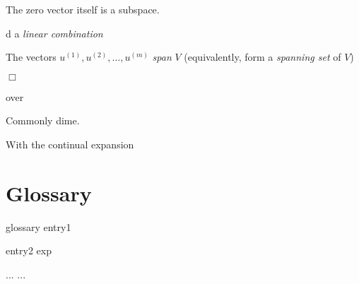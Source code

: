 The zero vector itself is a subspace.

\begin{definition}\label{1def:linearcomb}{\rm
d a {\it linear combination} 

The vectors $u^{(1)},u^{(2)},\ldots,u^{(m)}$ {\it span} $V$ 
(equivalently, form a {\it spanning set} of $V$) 

\hfill{$\Box$}
}\end{definition}

over

\begin{VT1}


Commonly  dime.

\VT
With the continual expansion 

\end{VT1}


\section{Glossary}
\begin{Glossary}
\item[glossary] entry1
\item[entry2] exp
\item[...] ...
\end{Glossary}



